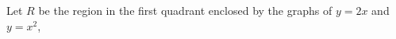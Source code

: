
%
%
%
%
% 
% 
\question  Let $R$ be the region in the first quadrant enclosed by the graphs of $y=2x$ and $y=x^2$, \asif


